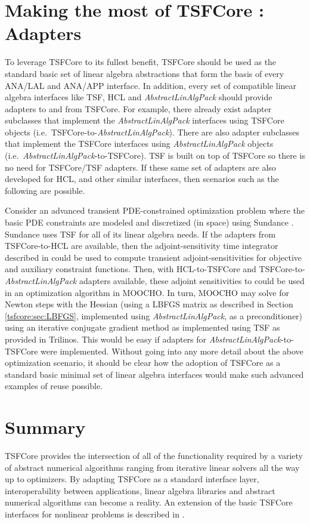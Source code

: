 %
\section{Making the most of TSFCore : Adapters}
\label{tsfcore:sec:adapters}
%

To leverage TSFCore to its fullest benefit, TSFCore should be used as the
standard basic set of linear algebra abstractions that form the basis of
every ANA/LAL and ANA/APP interface.  In addition, every set of
compatible linear algebra interfaces like TSF, HCL and
\textit{AbstractLinAlgPack} should provide adapters to and from TSFCore.
For example, there already exist adapter subclasses that implement the
\textit{AbstractLinAlgPack} interfaces using TSFCore objects
(i.e.~TSFCore-to-\textit{AbstractLinAlgPack}).  There are also adapter
subclasses that implement the TSFCore interfaces using
\textit{AbstractLinAlgPack} objects
(i.e.~\textit{AbstractLinAlgPack}-to-TSFCore).  TSF is built on
top of TSFCore so there is no need for TSFCore/TSF adapters.
If these same set of
adapters are also developed for HCL, and other similar
interfaces, then scenarios such as the
following are possible.

Consider an advanced transient PDE-constrained optimization problem
where the basic PDE constraints are modeled and discretized (in space)
using Sundance \cite{krlong:Sundance}.  Sundance uses TSF for all of
its linear algebra needs.  If the adapters from
TSFCore-to-HCL are available, then the adjoint-sensitivity time
integrator described in \cite{Gockenbach:2002:EAI} could be used to
compute transient adjoint-sensitivities for objective and auxiliary
constraint functions.  Then, with HCL-to-TSFCore and
TSFCore-to-\textit{AbstractLinAlgPack} adapters available, these
adjoint sensitivities to could be used in an optimization algorithm in
MOOCHO.  In turn, MOOCHO may solve for Newton steps with the Hessian
(using a LBFGS matrix as described in Section \ref{tsfcore:sec:LBFGS},
implemented using
\textit{AbstractLinAlgPack}, as a preconditioner) using an iterative
conjugate gradient method as implemented using TSF as provided in
Trilinos.  This would be easy if adapters for
\textit{AbstractLinAlgPack}-to-TSFCore were implemented.
Without going into any more detail about the above optimization
scenario, it should be clear how the adoption of TSFCore as a standard
basic minimal set of linear algebra interfaces would make such
advanced examples of reuse possible.

%
\section{Summary}
%

TSFCore provides the intersection of all of the functionality required
by a variety of abstract numerical algorithms ranging from iterative
linear solvers all the way up to optimizers.  By adapting TSFCore as a
standard interface layer, interoperability between applications,
linear algebra libraries and abstract numerical algorithms can become
a reality.  An extension of the basic TSFCore interfaces for nonlinear
problems is described in \cite{ref:TSFCore::Nonlin}.
